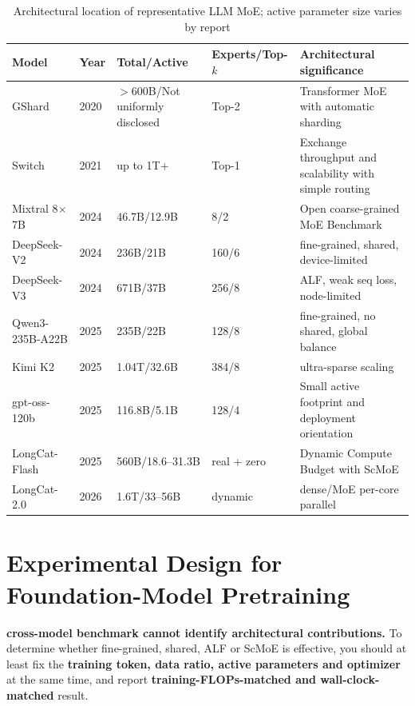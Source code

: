 \documentclass[10pt,a4paper,fontset=none]{ctexart}
\newcommand{\term}[1]{\textbf{#1}}
\begin{document}
\begin{table}[htbp]
\centering
\caption{Architectural location of representative LLM MoE; active parameter size varies by report}
\label{tab:models}
\scriptsize
\begin{tabularx}{\textwidth}{p{}C{15mm}C{25mm}C{22mm}Y}
\toprule
Model & Year & Total/Active & Experts/Top-$k$ & Architectural significance \\
\midrule
GShard & 2020 & $>$600B/Not uniformly disclosed & Top-2 & Transformer MoE with automatic sharding \\
Switch & 2021 & up to 1T+ & Top-1 & Exchange throughput and scalability with simple routing \\
Mixtral 8$\times$7B & 2024 & 46.7B/12.9B & 8/2 & Open coarse-grained MoE Benchmark \\
DeepSeek-V2 & 2024 & 236B/21B & 160/6 & fine-grained, shared, device-limited \\
DeepSeek-V3 & 2024 & 671B/37B & 256/8 & ALF, weak seq loss, node-limited \\
Qwen3-235B-A22B & 2025 & 235B/22B & 128/8 & fine-grained, no shared, global balance \\
Kimi K2 & 2025 & 1.04T/32.6B & 384/8 & ultra-sparse scaling \\
gpt-oss-120b & 2025 & 116.8B/5.1B & 128/4 & Small active footprint and deployment orientation \\
LongCat-Flash & 2025 & 560B/18.6--31.3B & real + zero & Dynamic Compute Budget with ScMoE \\
LongCat-2.0 & 2026 & 1.6T/33--56B & dynamic & dense/MoE per-core parallel \\
\bottomrule
\end{tabularx}
\end{table}

\section{Experimental Design for Foundation-Model Pretraining}

\term{ cross-model benchmark cannot identify architectural contributions. } To determine whether fine-grained, shared, ALF or ScMoE is effective, you should at least fix the \textbf{ training token, data ratio, active parameters and optimizer } at the same time, and report \textbf{training-FLOPs-matched and wall-clock-matched} result.
\end{document}
